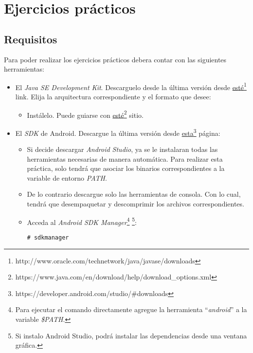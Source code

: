 \section{Ejercicios prácticos}

\subsection{Requisitos}
Para poder realizar los ejercicios prácticos debera contar con las siguientes herramientas:
\begin{itemize}
 \item El \textit{Java SE Development Kit}. Descarguelo desde la última versión desde \href{http://www.oracle.com/technetwork/java/javase/downloads}{esté}\footnote{http://www.oracle.com/technetwork/java/javase/downloads} link. Elija la arquitectura correspondiente y el formato que desee:
 \begin{itemize}
      \item Instálelo. Puede guiarse con \href{https://www.java.com/en/download/help/download\_options.xml}{esté}\footnote{https://www.java.com/en/download/help/download\_options.xml} sitio.
 \end{itemize}

 \item El \textit{SDK} de Android. Descargue la última versión desde \href{https://developer.android.com/studio/\#downloads}{esta}\footnote{https://developer.android.com/studio/\#downloads} página:
 \begin{itemize}
      \item Si decide descargar \textit{Android Studio}, ya se le instalaran todas las herramientas necesarias de manera automática. Para realizar esta práctica, solo tendrá que asociar los binarios correspondientes a la variable de entorno \textit{PATH}.
      \item De lo contrario descargue solo las herramientas de consola. Con lo cual, tendrá que desempaquetar y descomprimir los archivos correspondientes.
      
      \item Acceda al \textit{Android SDK Manager}\footnote{Para ejecutar el comando directamente agregue la herramienta ``\textit{android}'' a la variable \textit{\$PATH}.} \footnote{Si instalo Android Studio, podrá instalar las dependencias desde una ventana gráfica.}:
      \begin{lstlisting}
# sdkmanager
      \end{lstlisting}
     

\end{itemize}
\end{itemize}
